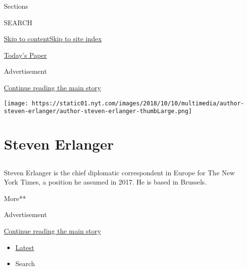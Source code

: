 Sections

SEARCH

\protect\hyperlink{site-content}{Skip to
content}\protect\hyperlink{site-index}{Skip to site index}

\href{https://myaccount.nytimes.com/auth/login?response_type=cookie\&client_id=vi}{}

\href{https://www.nytimes.com/section/todayspaper}{Today's Paper}

Advertisement

\protect\hyperlink{after-top}{Continue reading the main story}

\texttt{[image: https://static01.nyt.com/images/2018/10/10/multimedia/author-steven-erlanger/author-steven-erlanger-thumbLarge.png]}

\hypertarget{steven-erlanger}{%
\section{Steven Erlanger}\label{steven-erlanger}}

\subsection{}

Steven Erlanger is the chief diplomatic correspondent in Europe for The
New York Times, a position he assumed in 2017. He is based in Brussels.~

More**

Advertisement

\protect\hyperlink{after-mid1}{Continue reading the main story}

\begin{itemize}
\tightlist
\item
  \protect\hyperlink{stream-panel}{Latest}
\item
  Search
\end{itemize}

